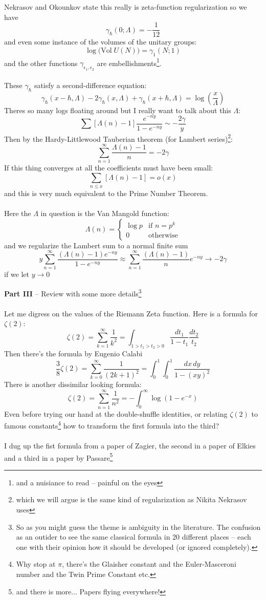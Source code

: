 \documentclass[12pt]{article}
\begin{document}
\noindent Nekrasov and Okounkov state this really is zeta-function regularization so we have
$$ \gamma_{\hbar}(0; \Lambda) = - \frac{1}{12} $$
and even some instance of the volumes of the unitary groups:
$$ \log \big( \text{Vol}\; U(N) \big) = \gamma_1(N; 1)$$ 
and the other functions $\gamma_{\epsilon_1, \epsilon_2}$ are embellishments\footnote{and a nuisiance to read -- painful on the eyes}. \\ \\
These $\gamma_\hbar$ satisfy a second-difference equation:
$$ \gamma_\hbar(x - \hbar, \Lambda  )
- 2\gamma_\hbar(x , \Lambda  )
+ \gamma_\hbar(x + \hbar, \Lambda  )
 = \log \left( \frac{x}{\Lambda} \right)$$
Theres so many logs floating around but I really want to talk about this $\Lambda$:
$$ \sum [\Lambda(n) - 1] \frac{e^{-ny}}{1 - e^{-ny}} \sim - \frac{2\gamma}{y} $$
Then by the Hardy-Littlewood Tauberian theorem (for Lambert series)\footnote{which we will argue is the same kind of regularization as Nikita Nekrasov uses}:
$$ \sum_{n=1}^\infty \frac{\Lambda(n)-1}{n} = - 2\gamma $$
If this thing converges at all the coefficients must have been small:
$$ \sum_{n \leq x} [ \Lambda(n)-1 ] = o(x)$$
and this is very much equivalent to the Prime Number Theorem. \\ \\
Here the $\Lambda$ in question is the Van Mangold function:
$$ \Lambda(n) = \left\{ 
\begin{array}{cl} 
\log p &  \text{if }n = p^k \\
0 & \text{otherwise}
\end{array}
\right. $$
and we regularize the Lambert sum to a normal finite sum
$$ 
y \sum_{n = 1}^\infty \frac{ (\Lambda(n) - 1)e^{-ny}}{1 - e^{-ny}}
\approx 
\sum_{n = 1}^\infty \frac{ (\Lambda(n) - 1)}{n} e^{-ny} \to - 2\gamma
$$
if we let $y \to 0$
\newpage

\noindent \textbf{Part III} -- Review with some more details\footnote{So as you might guess the theme is ambiguity in the literature.  The confusion as an outider to see the same classical formula in 20 different places -- each one with their opinion how it should be developed (or ignored completely).} \\ \\
Let me digress on the values of the Riemann Zeta function.  Here is a formula for $\zeta(2)$:
$$ \zeta(2) = \sum_{k=1}^\infty \frac{1}{k^2}
= \int_{1 > t_1 > t_2 > 0} \frac{dt_1}{1-t_1}\frac{dt_2}{t_2} $$
Then there's the formula by Eugenio Calabi
$$ \frac{3}{8} \zeta(2)=\sum_{k=0}^\infty \frac{1}{(2k+1)^2} = \int_0^1 \int_0^1 \frac{dx \, dy}{1 - (xy)^2} $$
There is another dissimilar looking formula:
$$ \zeta(2)  = \sum_{n=1}^\infty \frac{1}{n^2} = - \int_0^\infty \log(1 - e^{-x})$$
Even before trying our hand at the double-shuffle identities, or relating $\zeta(2)$ to famous constants\footnote{Why stop at $\pi$, there's the Glaisher constant and the Euler-Masceroni number and the Twin Prime Constant etc.} how to transform the first formula into the third? \\ \\
I dug up the fist formula from a paper of Zagier, the second in a paper of Elkies and a third in a paper by Passare\footnote{and there is more... Papers flying everywhere!}
\end{document}
